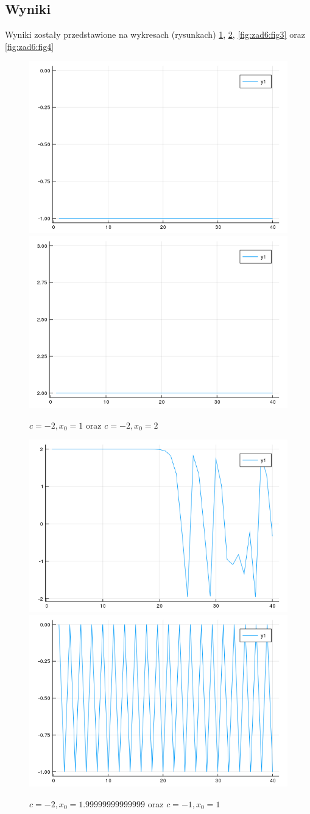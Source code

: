 \documentclass{article}
\begin{document}
        \subsection{Wyniki}
            Wyniki zostały przedstawione na wykresach (rysunkach)
            \ref{fig:zad6:fig1},
            \ref{fig:zad6:fig2},
            \ref{fig:zad6:fig3} oraz
            \ref{fig:zad6:fig4}
            \begin{figure}
                \centering                 \includegraphics[width=0.49\linewidth]{plot_1.png}                \includegraphics[width=0.49\linewidth]{plot_2.png}
                \caption{$c = -2, x_0 = 1$ oraz $c = -2, x_0 = 2$}
                \label{fig:zad6:fig1}
            \end{figure}
            \begin{figure}
                \centering                 \includegraphics[width=0.49\linewidth]{plot_3.png}                \includegraphics[width=0.49\linewidth]{plot_4.png}
                \caption{$c = -2, x_0 = 1.99999999999999$ oraz $c = -1, x_0 = 1$}
                \label{fig:zad6:fig2}
            \end{figure}
\end{document}
